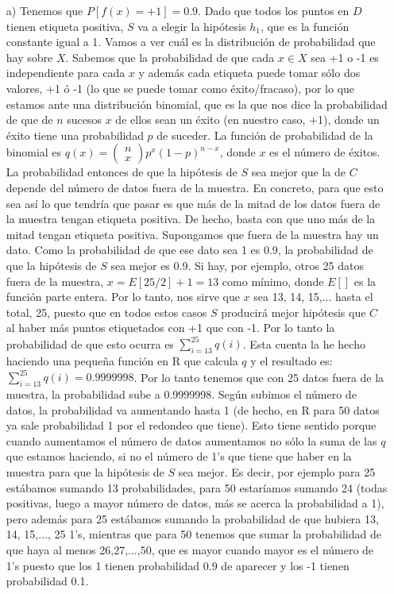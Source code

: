 \documentclass[12pt]{article}
\theoremstyle{definition}
\begin{document}
\begin{pregunta}
\begin{enumerate}
\item[a)] Tenemos que $P[f(x) = +1]=0.9$. Dado que todos los puntos en $D$ tienen etiqueta positiva, $S$ va a elegir la hipótesis $h_1$, que es la función constante igual a 1. Vamos a ver cuál es la distribución de probabilidad que hay sobre $X$. Sabemos que la probabilidad de que cada $x \in X$ sea +1 o -1 es independiente para cada $x$ y además cada etiqueta puede tomar sólo dos valores, +1 ó -1 (lo que se puede tomar como éxito/fracaso), por lo que estamos ante una distribución binomial, que es la que nos dice la probabilidad de que de $n$ sucesos $x$ de ellos sean un éxito (en nuestro caso, +1), donde un éxito tiene una probabilidad $p$ de suceder. La función de probabilidad de la binomial es $q(x) = \left( \begin{array}{c} n \\ x \end{array} \right) p^x(1-p)^{n-x}$, donde $x$ es el número de éxitos. La probabilidad entonces de que la hipótesis de $S$ sea mejor que la de $C$ depende del número de datos fuera de la muestra. En concreto, para que esto sea así lo que tendría que pasar es que más de la mitad de los datos fuera de la muestra tengan etiqueta positiva. De hecho, basta con que uno más de la mitad tengan etiqueta positiva. Supongamos que fuera de la muestra hay un dato. Como la probabilidad de que ese dato sea 1 es 0.9, la probabilidad de que la hipótesis de $S$ sea mejor es 0.9. Si hay, por ejemplo, otros 25 datos fuera de la muestra, $x=E[25/2] +1=13$ como mínimo, donde $E[]$ es la función parte entera. Por lo tanto, nos sirve que $x$ sea 13, 14, 15,... hasta el total, 25, puesto que en todos estos casos $S$ producirá mejor hipótesis que $C$ al haber más puntos etiquetados con +1 que con -1. Por lo tanto la probabilidad de que esto ocurra es $\sum_{i=13}^{25} q(i)$. Esta cuenta la he hecho haciendo una pequeña función en R que calcula $q$ y el resultado es: $\sum_{i=13}^{25} q(i) = 0.9999998$. Por lo tanto tenemos que con 25 datos fuera de la muestra, la probabilidad sube a 0.9999998. Según subimos el número de datos, la probabilidad va aumentando hasta 1 (de hecho, en R para 50 datos ya sale probabilidad 1 por el redondeo que tiene). Esto tiene sentido porque cuando aumentamos el número de datos aumentamos no sólo la suma de las $q$ que estamos haciendo, si no el número de 1's que tiene que haber en la muestra para que la hipótesis de $S$ sea mejor. Es decir, por ejemplo para 25 estábamos sumando 13 probabilidades, para 50 estaríamos sumando 24 (todas positivas, luego a mayor número de datos, más se acerca la probabilidad a 1), pero además para 25 estábamos sumando la probabilidad de que hubiera 13, 14, 15,..., 25 1's, mientras que para 50 tenemos que sumar la probabilidad de que haya al menos 26,27,...,50, que es mayor cuando mayor es el número de 1's puesto que los 1 tienen probabilidad 0.9 de aparecer y los -1 tienen probabilidad 0.1.\\


\end{enumerate}
\end{pregunta}
\end{document}
